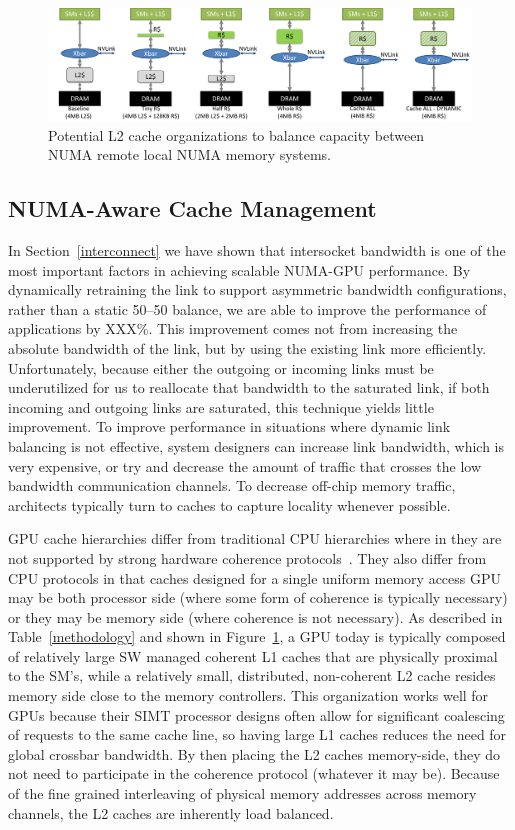 \begin{figure}[t]
    \centering
    \includegraphics[width=1.0\textwidth]{figures/cache_configurations.pdf}
    \caption{Potential L2 cache organizations to balance capacity between NUMA remote
    local NUMA memory systems.}
    \label{fig:cacheorg}
\end{figure}

\subsection{NUMA-Aware Cache Management}
\label{caching}
In Section~\ref{interconnect} we have shown that intersocket bandwidth is one
of the most important factors in achieving scalable NUMA-GPU performance. By
dynamically retraining the link to support asymmetric bandwidth configurations,
rather than a static 50--50 balance, we are able to improve the performance
of applications by XXX\%.  This improvement comes not from increasing the
absolute bandwidth of the link, but by using the existing link more efficiently.
Unfortunately, because either the outgoing or incoming links must be underutilized
for us to reallocate that bandwidth to the saturated link,  if both incoming and
outgoing links are saturated, this technique yields little improvement.
To improve performance in situations where dynamic link balancing is not effective,
system designers can increase link bandwidth, which is very expensive,
or try and decrease the amount of traffic that crosses the low bandwidth
communication channels.  To decrease off-chip memory traffic, architects typically
turn to caches to capture locality whenever possible.

GPU cache hierarchies differ from traditional CPU hierarchies where in they are
not supported by strong hardware coherence protocols~\cite{XXX}.  They also differ
from CPU protocols in that caches designed for a single uniform memory access GPU
may be both processor side (where some form of coherence is typically necessary)
or they may be memory side (where coherence is not necessary).  As described in
Table~\ref{methodology} and shown in Figure~\ref{fig:cacheorg}, a GPU today is
typically composed of relatively large SW managed coherent L1 caches that are 
physically proximal to the SM's, while a relatively small, distributed, non-coherent 
L2 cache resides memory side close to the memory controllers.  This
organization works well for GPUs because their SIMT processor designs often allow
for significant coalescing of requests to the same cache line, so having large
L1 caches reduces the need for global crossbar bandwidth.  By then placing the L2
caches memory-side, they do not need to participate in the coherence protocol (whatever
it may be).  Because of the fine grained interleaving of physical memory addresses
across memory channels, the L2 caches are inherently load balanced.

